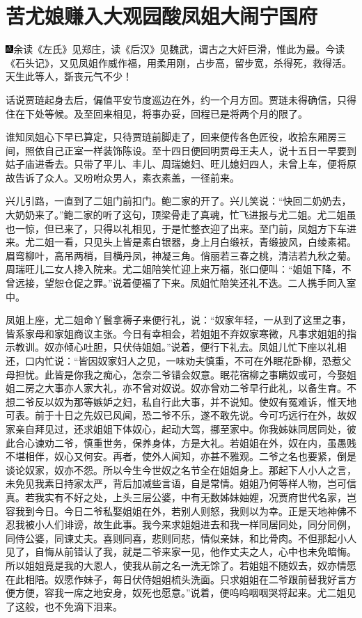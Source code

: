 
\chapter{苦尤娘赚入大观园\hspace{.5em}酸凤姐大闹宁国府}

{\includegraphics[width=3mm]{../Images/00005}\kaishu 余读《左氏》见郑庄，读《后汉》见魏武，谓古之大奸巨滑，惟此为最。今读《石头记》，又见凤姐作威作福，用柔用刚，占步高，留步宽，杀得死，救得活。天生此等人，斲丧元气不少！}

话说贾琏起身去后，偏值平安节度巡边在外，约一个月方回。贾琏未得确信，只得住在下处等候。及至回来相见，将事办妥，回程已是将两个月的限了。

谁知凤姐心下早已算定，只待贾琏前脚走了，回来便传各色匠役，收拾东厢房三间，照依自己正室一样装饰陈设。至十四日便回明贾母王夫人，说十五日一早要到姑子庙进香去。只带了平儿、丰儿、周瑞媳妇、旺儿媳妇四人，未曾上车，便将原故告诉了众人。又吩咐众男人，素衣素盖，一径前来。

兴儿引路，一直到了二姐门前扣门。鲍二家的开了。兴儿笑说：“快回二奶奶去，大奶奶来了。”鲍二家的听了这句，顶梁骨走了真魂，忙飞进报与尤二姐。尤二姐虽也一惊，但已来了，只得以礼相见，于是忙整衣迎了出来。至门前，凤姐方下车进来。尤二姐一看，只见头上皆是素白银器，身上月白缎袄，青缎披风，白绫素裙。眉弯柳叶，高吊两梢，目横丹凤，神凝三角。俏丽若三春之桃，清洁若九秋之菊。周瑞旺儿二女人搀入院来。尤二姐陪笑忙迎上来万福，张口便叫：“姐姐下降，不曾远接，望恕仓促之罪。”说着便福了下来。凤姐忙陪笑还礼不迭。二人携手同入室中。

凤姐上座，尤二姐命丫鬟拿褥子来便行礼，说：“奴家年轻，一从到了这里之事，皆系家母和家姐商议主张。今日有幸相会，若姐姐不弃奴家寒微，凡事求姐姐的指示教训。奴亦倾心吐胆，只伏侍姐姐。”说着，便行下礼去。凤姐儿忙下座以礼相还，口内忙说：“皆因奴家妇人之见，一味劝夫慎重，不可在外眠花卧柳，恐惹父母担忧。此皆是你我之痴心，怎奈二爷错会奴意。眠花宿柳之事瞒奴或可，今娶姐姐二房之大事亦人家大礼，亦不曾对奴说。奴亦曾劝二爷早行此礼，以备生育。不想二爷反以奴为那等嫉妒之妇，私自行此大事，并不说知。使奴有冤难诉，惟天地可表。前于十日之先奴已风闻，恐二爷不乐，遂不敢先说。今可巧远行在外，故奴家亲自拜见过，还求姐姐下体奴心，起动大驾，挪至家中。你我姊妹同居同处，彼此合心谏劝二爷，慎重世务，保养身体，方是大礼。若姐姐在外，奴在内，虽愚贱不堪相伴，奴心又何安。再者，使外人闻知，亦甚不雅观。二爷之名也要紧，倒是谈论奴家，奴亦不怨。所以今生今世奴之名节全在姐姐身上。那起下人小人之言，未免见我素日持家太严，背后加减些言语，自是常情。姐姐乃何等样人物，岂可信真。若我实有不好之处，上头三层公婆，中有无数姊妹妯娌，况贾府世代名家，岂容我到今日。今日二爷私娶姐姐在外，若别人则怒，我则以为幸。正是天地神佛不忍我被小人们诽谤，故生此事。我今来求姐姐进去和我一样同居同处，同分同例，同侍公婆，同谏丈夫。喜则同喜，悲则同悲，情似亲妹，和比骨肉。不但那起小人见了，自悔从前错认了我，就是二爷来家一见，他作丈夫之人，心中也未免暗悔。所以姐姐竟是我的大恩人，使我从前之名一洗无馀了。若姐姐不随奴去，奴亦情愿在此相陪。奴愿作妹子，每日伏侍姐姐梳头洗面。只求姐姐在二爷跟前替我好言方便方便，容我一席之地安身，奴死也愿意。”说着，便呜呜咽咽哭将起来。尤二姐见了这般，也不免滴下泪来。

